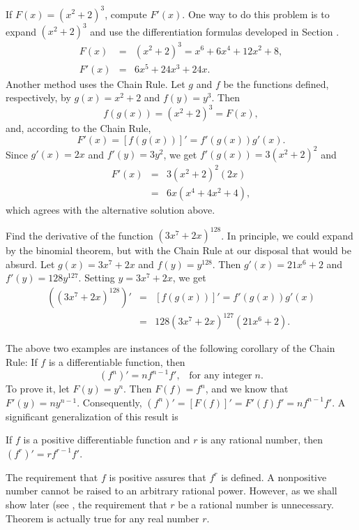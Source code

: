\begin{example}
\label{exam 1.8.1}
If $F(x) = (x^2 + 2)^3$, compute $F'(x)$.
One way to do this problem is to expand $(x^2 + 2)^3$
and use the differentiation formulas developed in Section .
\begin{eqnarray*}
F(x) &=& (x^2 + 2)^3 = x^6 + 6x^4 + 12x^2 + 8, \\
F'(x) &=& 6x^5 + 24x^3 + 24x.
\end{eqnarray*}
Another method uses the Chain Rule.
Let $g$ and $f$ be the functions defined, respectively,
by $g(x) = x^2 + 2$ and $f(y) = y^3$. Then
$$
f(g(x)) = (x^2 + 2)^3 = F(x),
$$
and, according to the Chain Rule,
$$
F'(x) = [f (g(x))]' = f'(g(x))g'(x) .
$$
Since $g'(x) = 2x$ and  $f'(y) = 3y^2$, we get $f'(g(x)) = 3(x^2 + 2)^2$
and
\begin{eqnarray*}
F'(x) &=& 3(x^2 + 2)^2(2x)\\
&=& 6x(x^4 + 4x^2 + 4),
\end{eqnarray*}
which agrees with the alternative solution above.
\end{example}

\begin{example}
\label{exam 1.8.2}
Find the derivative of the function $(3x^7 + 2x)^{128}$.
In principle, we could expand by the binomial theorem,
but with the Chain Rule at our disposal
that would be absurd.
Let $g(x) = 3x^7 + 2x$ and $f(y) = y^{128}$.
Then $g'(x) = 21x^6 + 2$ and $f'(y) = 128y^{127}$.
Setting $y = 3x^7 + 2x$, we get
\begin{eqnarray*}
((3x^7 + 2x)^{128})' &=& [f(g(x))]' = f'(g(x))g'(x)\\
                                &=& 128{(3x^7 + 2x)^{127}}(21x^6 + 2).
\end{eqnarray*}
\end{example}

The above two examples are instances of the following
corollary of the Chain Rule:
If $f$ is a differentiable function, then
$$
(f^n)' = nf^{n-1}f',    \;\;\; \mbox{for any integer} \; n.
$$
To prove it, let $F(y) = y^n$.
Then $F(f) = f^n$,
and we know that $F'(y) = ny^{n-1}$.
Consequently, $(f^n)' = [F(f)]' = F'(f) f' = nf^{n-1}f'$.
A significant generalization of this result is

\begin{prop}
\label{thm 1.8.2}
If $f$ is a positive differentiable function
and $r$ is any rational number,
then $(f^r)' = rf^{r-1}f'$.
\end{prop}

The requirement that $f$ is positive assures that $f^r$ is defined.
A nonpositive number cannot be raised to an arbitrary rational power.
However, as we shall show later (see ,
the requirement that $r$ be a rational number is unnecessary.
Theorem  is actually true for any real number $r$.

